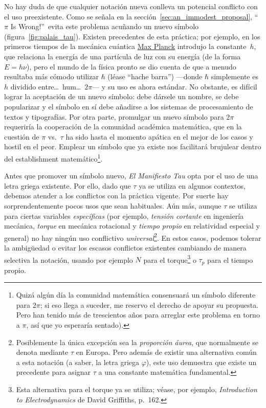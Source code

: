 No hay duda de que cualquier notación nueva conlleva un potencial conflicto con el uso preexistente. Como se señala en la sección~\ref{sec:an_immodest_proposal}, ``$\pi$ Is Wrong!''\ evita este problema acuñando un nuevo símbolo (figura~\ref{fig:palais_tau}). Existen precedentes de esta práctica; por ejemplo, en los primeros tiempos de la mecánica cuántica \href{https://es.wikipedia.org/wiki/Max_Planck}{Max Planck} introdujo la constante~$h$, que relaciona la energía de una partícula de luz con su energía (de la forma $E = h\nu$), pero el mundo de la física pronto se dio cuenta de que a menudo resultaba más cómodo utilizar $\hbar$ (léase ``hache barra'') ---donde $\hbar$ simplemente es $h$ dividido entre\ldots\ hum\ldots\ $2\pi$--- y su uso es ahora estándar. No obstante, es difícil lograr la aceptación de un nuevo símbolo: debe dársele un nombre, se debe popularizar y el símbolo en sí debe añadirse a los sistemas de procesamiento de textos y tipografías. Por otra parte, promulgar un nuevo símbolo para $2\pi$ requeriría la cooperación de la comunidad académica matemática, que en la cuestión de $\pi$ vs.\ $\tau$ ha sido hasta el momento apática en el mejor de los casos y hostil en el peor. Emplear un símbolo que ya existe nos facilitará brujulear dentro del establishment matemático\footnote{Quizá algún día la comunidad matemática consensuará un símbolo diferente para $2\pi$; si eso llega a suceder, me reservo el derecho de apoyar su propuesta. Pero han tenido más de trescientos años para arreglar este problema en torno a $\pi$, así que yo esperaría sentado).}.

Antes que promover un símbolo nuevo, \emph{El Manifiesto Tau} opta por el uso de una letra griega existente. Por ello, dado que $\tau$ ya se utiliza en algunos contextos, debemos atender a los conflictos con la práctica vigente. Por suerte hay sorprendentemente pocos usos que sean habituales. Aún más, aunque $\tau$ se utiliza para ciertas variables \emph{específicas} (por ejemplo, \emph{tensión cortante} en ingeniería mecánica, \emph{torque} en mecánica rotacional y  \emph{tiempo propio} en relatividad especial y general) no hay ningún uso conflictivo \emph{universal}\footnote{Posiblemente la única excepción sea la \emph{proporción áurea}, que normalmente se denota mediante $\tau$ en Europa. Pero además de existir una alternativa común a esta notación (a saber, la letra griega $\varphi$), este uso demuestra que existe un precedente para asignar $\tau$ a una constante matemática fundamental.}. En estos casos, podemos tolerar la ambigüedad o evitar los escasos conflictos existentes cambiando de manera selectiva la notación, usando por ejemplo $N$ para el torque\footnote{Esta alternativa para el torque ya se utiliza; véase, por ejemplo, \emph{Introduction to Electrodynamics} de David Griffiths, p.~162.} o $\tau_p$ para el tiempo propio.


